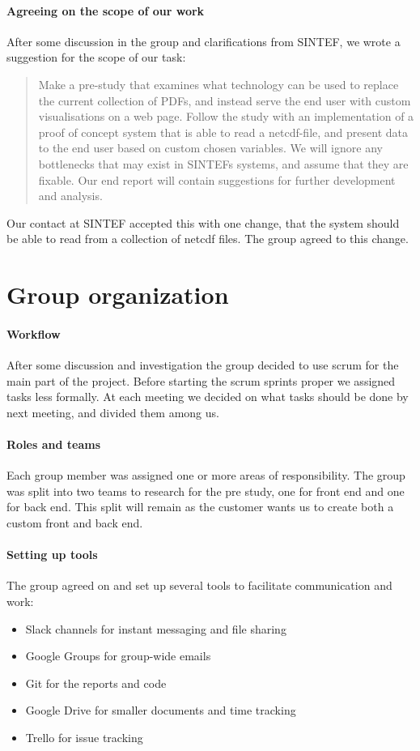 \documentclass[11pt,a4paper,titlepage,oneside]{report}
\begin{document}
\paragraph{Agreeing on the scope of our work}
After some discussion in the group and clarifications from SINTEF, we wrote a suggestion for the scope of our task: 
\begin{quote} Make a pre-study that examines what technology can be used to replace the current collection of PDFs, and instead serve the end user with custom visualisations on a web page. Follow the study with an implementation of a proof of concept system that is able to read a \gls{netcdf}-file, and present data to the end user based on custom chosen variables. We will ignore any bottlenecks that may exist in SINTEFs systems, and assume that they are fixable. Our end report will contain suggestions for further development and analysis.
\end{quote}
Our contact at SINTEF accepted this with one change, that the system should be able to read from a collection of \gls{netcdf} files. The group agreed to this change.

\section{Group organization}
\paragraph{Workflow}
After some discussion and investigation the group decided to use scrum for the main part of the project. Before starting the scrum sprints proper we assigned tasks less formally. At each meeting we decided on what tasks should be done by next meeting, and divided them among us.

\paragraph{Roles and teams}
Each group member was assigned one or more areas of responsibility. The group was split into two teams to research for the pre study, one for front end and one for back end. This split will remain as the customer wants us to create both a custom front and back end.

\paragraph{Setting up tools}
The group agreed on and set up several tools to facilitate communication and work:
\begin{itemize}
	\item Slack channels for instant messaging and file sharing
	\item Google Groups for group-wide emails
	\item Git for the reports and code
	\item Google Drive for smaller documents and time tracking
	\item Trello for issue tracking
\end{itemize}
\end{document}
